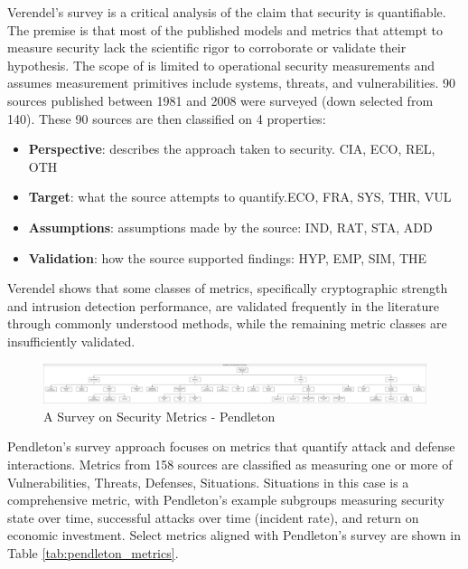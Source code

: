 Verendel’s survey\cite{Verendel_2009} is a critical analysis of the claim that security is quantifiable. The premise is that most of the published models and metrics that attempt to measure security lack the scientific rigor to corroborate or validate their hypothesis. 
The scope of \cite{Verendel_2009} is limited to operational security measurements and assumes measurement primitives include systems, threats, and vulnerabilities.
90 sources published between 1981 and 2008 were surveyed (down selected from 140). These 90 sources are then classified on 4 properties: 
\begin{itemize}
\item \textbf{Perspective}: describes the approach taken to security. { CIA, ECO, REL, OTH}
\item \textbf{Target}: what the source attempts to quantify.{ECO, FRA, SYS, THR, VUL}
\item \textbf{Assumptions}: assumptions made by the source: {IND, RAT, STA, ADD}
\item \textbf{Validation}: how the source supported findings: {HYP, EMP, SIM, THE}
\end{itemize}

Verendel shows that some classes of metrics, specifically cryptographic strength and intrusion detection performance, are validated frequently in the literature through commonly understood methods, while the remaining metric classes are insufficiently validated. 

\begin{figure}[ht]
\centering
\includegraphics[width=.95\linewidth]{resource/img/ch_background/cybok_metrics/pendleton_metric_taxonomy_drawio.png}
\caption{A Survey on Security Metrics - Pendleton\cite{Pendleton_Garcia-Lebron_Cho_Xu_2016}}
\label{fig:background:pendleton_taxonomy}
\end{figure} 


Pendleton’s survey\cite{ Pendleton_Garcia-Lebron_Xu_2016, Pendleton_Garcia-Lebron_Cho_Xu_2016} approach focuses on metrics that quantify attack and defense interactions. Metrics from 158 sources are classified as measuring one or more of Vulnerabilities, Threats, Defenses, Situations. Situations in this case is a comprehensive metric, with Pendleton’s example subgroups measuring security state over time, successful attacks over time (incident rate), and return on economic investment. Select metrics aligned with Pendleton's survey are shown in Table \ref{tab:pendleton_metrics}.

